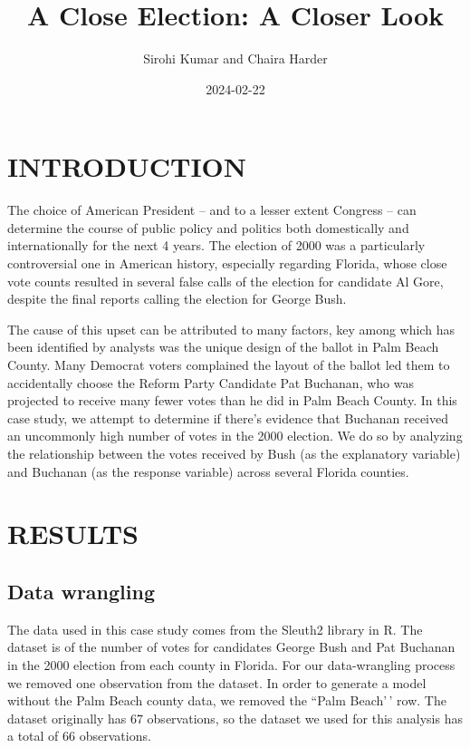 \documentclass[
  letterpaper,
  DIV=11,
  numbers=noendperiod]{scrartcl}
\title{A Close Election: A Closer Look}
\author{Sirohi Kumar and Chaira Harder}
\date{2024-02-22}
\begin{document}
\maketitle
\ifdefined\Shaded\renewenvironment{Shaded}{\begin{tcolorbox}[enhanced, frame hidden, boxrule=0pt, interior hidden, borderline west={3pt}{0pt}{shadecolor}, breakable, sharp corners]}{\end{tcolorbox}}\fi

\hypertarget{introduction}{%
\section{INTRODUCTION}\label{introduction}}

The choice of American President -- and to a lesser extent Congress --
can determine the course of public policy and politics both domestically
and internationally for the next 4 years. The election of 2000 was a
particularly controversial one in American history, especially regarding
Florida, whose close vote counts resulted in several false calls of the
election for candidate Al Gore, despite the final reports calling the
election for George Bush.

The cause of this upset can be attributed to many factors, key among
which has been identified by analysts was the unique design of the
ballot in Palm Beach County. Many Democrat voters complained the layout
of the ballot led them to accidentally choose the Reform Party Candidate
Pat Buchanan, who was projected to receive many fewer votes than he did
in Palm Beach County. In this case study, we attempt to determine if
there's evidence that Buchanan received an uncommonly high number of
votes in the 2000 election. We do so by analyzing the relationship
between the votes received by Bush (as the explanatory variable) and
Buchanan (as the response variable) across several Florida counties.

\hypertarget{results}{%
\section{RESULTS}\label{results}}

\hypertarget{data-wrangling}{%
\subsection{Data wrangling}\label{data-wrangling}}

The data used in this case study comes from the Sleuth2 library in R.
The dataset is of the number of votes for candidates George Bush and Pat
Buchanan in the 2000 election from each county in Florida. For our
data-wrangling process we removed one observation from the dataset. In
order to generate a model without the Palm Beach county data, we removed
the ``Palm Beach'\,' row. The dataset originally has 67 observations, so
the dataset we used for this analysis has a total of 66 observations.
\end{document}
